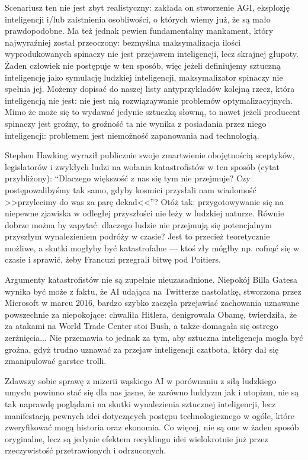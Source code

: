 \documentclass[10pt,a4paper]{article}
\begin{document}
	\par Scenariusz ten nie jest zbyt realistyczny: zakłada on stworzenie AGI, eksplozję inteligencji i/lub zaistnienia osobliwości, o których wiemy już, że są mało prawdopodobne. Ma też jednak pewien fundamentalny mankament, który najwyraźniej został przeoczony: bezmyślna maksymalizacja ilości wyprodukowanych spinaczy nie jest przejawem inteligencji, lecz skrajnej głupoty. Żaden człowiek nie postępuje w ten sposób, więc jeżeli definiujemy sztuczną inteligencję jako symulację ludzkiej inteligencji, maksymalizator spinaczy nie spełnia jej. Możemy dopisać do naszej listy antyprzykładów kolejną rzecz, która inteligencją nie jest: nie jest nią rozwiązaywanie problemów optymalizacyjnych. Mimo że może się to wydawać jedynie sztuczką słowną, to nawet jeżeli producent spinaczy jest groźny, to groźność ta nie wynika z posiadania przez niego inteligencji: problemem jest niemożność zapanowania nad technologią.
	\par Stephen Hawking wyraził publicznie swoje zmartwienie obojętnością sceptyków, legislatorów i zwykłych ludzi na wołania katastrofistów w ten sposób (cytat przybliżony): ``Dlaczego większość z nas się tym nie przejmuje? Czy postępowalibyśmy tak samo, gdyby kosmici przysłali nam wiadomość >>przylecimy do was za parę dekad<<''? Otóż tak: przygotowywanie się na niepewne zjawiska w odległej przyszłości nie leży w ludzkiej naturze. Równie dobrze można by zapytać: dlaczego ludzie nie przejmują się potencjalnym przyszłym wynalezieniem podróży w czasie? Jest to przecież teoretycznie możliwe, a skutki mogłyby być katastrofalne — ktoś zły mógłby np. cofnąć się w czasie i sprawić, żeby Francuzi przegrali bitwę pod Poitiers.
	\par Argumenty katastrofistów nie są zupełnie nieuzasadnione. Niepokój Billa Gatesa wynika być może z faktu, że AI udająca na Twitterze nastolatkę, stworzona przez Microsoft w marcu 2016, bardzo szybko zaczęła przejawiać zachowania uznawane powszechnie za niepokojące: chwaliła Hitlera, denigrowała Obamę, twierdziła, że za atakami na World Trade Center stoi Bush, a także domagała się ostrego zerżnięcia... Nie przemawia to jednak za tym, aby sztuczna inteligencja mogła być groźna, gdyż trudno uznawać za przejaw inteligencji czatbota, który dał się zmanipulować garstce trolli.
	\par Zdawszy sobie sprawę z mizerii wąskiego AI w porównaniu z siłą ludzkiego umysłu powinno stać się dla nas jasne, że zarówno luddyzm jak i utopizm, nie są tak naprawdę poglądami na skutki wynalezienia sztucznej inteligencji, lecz manifestacją pewnych idei dotyczących postępu technologicznego w ogóle, które zweryfikować mogą historia oraz ekonomia. Co więcej, nie są one w żaden sposób oryginalne, lecz są jedynie efektem recyklingu idei wielokrotnie już przez rzeczywistość przetrawionych i odrzuconych.
\end{document}
